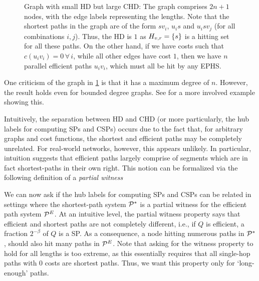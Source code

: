 \begin{figure}
	
	\caption{Graph with small HD but large CHD: The graph comprises $2n+1$ nodes, with the edge labels representing the lengths. Note that the shortest paths in the graph are of the form $sv_i$, $u_is$ and $u_isv_j$ (for all combinations $i,j$). Thus, the HD is $1$ as $H_{v,r}=\{s\}$ is a hitting set for all these paths. On the other hand, if we have costs such that $c(u_iv_i)=0\,\forall\,i$, while all other edges have cost $1$, then we have $n$ parallel efficient paths $u_iv_i$, which must all be hit by any EPHS.}
	\label{fig:big_chd}
\end{figure}

\begin{remark}
	One criticism of the graph in \cref{fig:big_chd} is that it has a maximum degree of $n$.
	However, the result holds even for bounded degree graphs.
	See \cite{TechReport} for a more involved example showing this.
\end{remark}

Intuitively, the separation between HD and CHD (or more particularly, the hub labels for computing SPs and CSPs) occurs due to the fact that, for arbitrary graphs and cost functions, the shortest and efficient paths may be completely unrelated. 
For real-world networks, however, this appears unlikely.
In particular, intuition suggests that efficient paths largely comprise of segments which are in fact shortest-paths in their own right. 
This notion can be formalized via the following definition of a \emph{partial witness} 
We can now ask if the hub labels for computing SPs and CSPs can be related in settings where the shortest-path system $\mathcal{P}^*$ is a partial witness for the efficient path system $\mathcal{P}^E$.
At an intuitive level, the partial witness property says that efficient and shortest paths are not completely different, i.e., if $Q$ is efficient, a fraction $2^{-\beta}$ of $Q$ is a SP.
As a consequence, a node hitting numerous paths in $\mathcal{P}^*$, should also hit many paths in $\mathcal{P}^E$.
Note that asking for the witness property to hold for all lengths is too extreme, as this essentially requires that all single-hop paths with 0 costs are shortest paths.
Thus, we want this property only for `long-enough' paths. 

